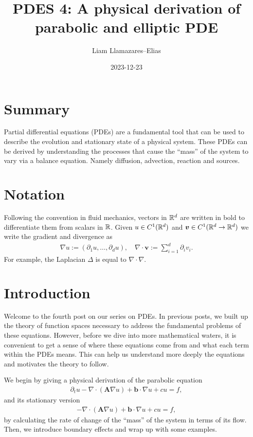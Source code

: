 \documentclass[
    a4paper,
    DIV=14,
    abstract=true,
    numbers=noenddot
]{scrartcl}
\begin{document}
\title{PDES 4: A physical derivation of parabolic and elliptic PDE}
\author{Liam Llamazares--Elias}
\date{2023-12-23}
\maketitle
\section{ Summary}
Partial differential equations (PDEs) are a fundamental tool that can be used to describe the evolution and stationary state of a physical system. These PDEs can be derived by understanding the processes that cause the ``mass'' of the system to vary via a balance equation. Namely diffusion, advection, reaction and sources.

\section{Notation}
Following the convention in fluid mechanics,  vectors in $\mathbb{R}^d$ are written in bold to differentiate them from scalars in $\mathbb{R}$. Given $u \in C^1(\mathbb{R}^d)$ and $\bm{v} \in C^1(\mathbb{R}^d \to \mathbb{R}^d)$ we write the gradient and divergence as
\begin{align*}
	\nabla u :=(\partial _1 u,\ldots, \partial _d u), \quad \nabla \cdot \bm{v}:= \sum_{i=1}^{d} \partial _i v_i.
\end{align*}
For example, the Laplacian $\Delta $ is equal to $\nabla \cdot \nabla $.

\section{Introduction}
Welcome to the fourth post on our series on PDEs. In previous posts, we built up the theory of function spaces necessary to address the fundamental problems of these equations. However, before we dive into more mathematical waters, it is convenient to get a sense of where these equations come from and what each term within the PDEs means. This can help us understand more deeply the equations and motivates the theory to follow.

We begin by giving a physical derivation of the parabolic equation
\begin{align}\label{PDE}
	\partial_t u-\nabla \cdot (\bm{A}\nabla u) +\bm{b} \cdot \nabla u + cu = f,\end{align}
and its stationary version
\begin{align*}
	-\nabla \cdot (\bm{A}\nabla u) +\bm{b} \cdot \nabla u + cu =f,
\end{align*}
by calculating the rate of change of the ``mass'' of the system in terms of its flow. Then, we introduce boundary effects and wrap up with some examples.
\end{document}
